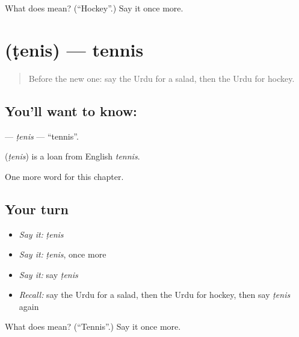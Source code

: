 \begin{tcolorbox}[breakable,colback=teal!4,colframe=teal!35!black,title={Before you move on}]
What does  mean? (\textquotedblleft{}Hockey\textquotedblright{}.) Say it once more.
\end{tcolorbox}
\section[\texorpdfstring{\ur{ٹینس} (ṭenis)}{ٹینس (ṭenis)}]{ (ṭenis) — tennis}

\label{lesson:UR-C201-tenis}



\begin{quote}
Before the new one: say the Urdu for a salad, then the Urdu for hockey.
\end{quote}

\subsection*{You'll want to know: }
\textbf{} — \emph{ṭenis} — \textquotedblleft{}tennis\textquotedblright{}.

\begin{cousinweb}
\textbf{} (\emph{ṭenis}) is a loan from English \emph{tennis}.
\end{cousinweb}

\begin{grammarlens}[title={What you've built}]
One more word for this chapter.
\end{grammarlens}

\subsection*{Your turn}
\begin{itemize}
\raggedright
  \item \emph{Say it:} \emph{ṭenis}
  \item \emph{Say it:} \emph{ṭenis}, once more
  \item \emph{Say it:} say \emph{ṭenis}
  \item \emph{Recall:} say the Urdu for a salad, then the Urdu for hockey, then say \emph{ṭenis} again
\end{itemize}

\begin{tcolorbox}[breakable,colback=teal!4,colframe=teal!35!black,title={Before you move on}]
What does  mean? (\textquotedblleft{}Tennis\textquotedblright{}.) Say it once more.
\end{tcolorbox}
